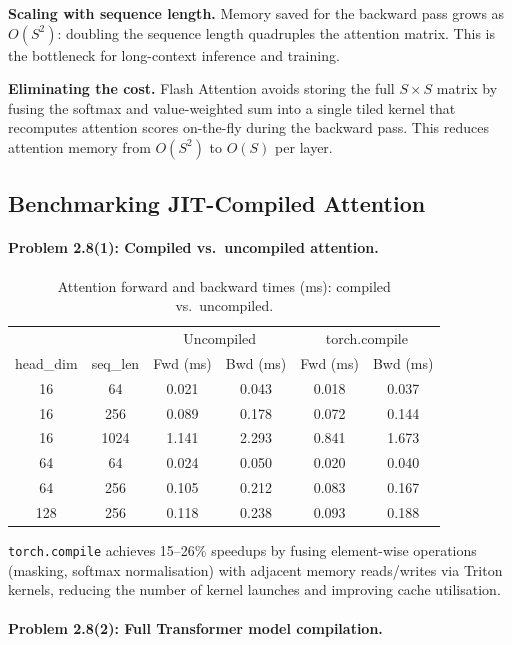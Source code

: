 \documentclass[11pt]{article}
\begin{document}
\textbf{Scaling with sequence length.} Memory saved for the backward pass grows as
$O(S^2)$: doubling the sequence length quadruples the attention matrix. This is the
bottleneck for long-context inference and training.

\textbf{Eliminating the cost.} Flash Attention avoids storing the full $S\times S$
matrix by fusing the softmax and value-weighted sum into a single tiled kernel that
recomputes attention scores on-the-fly during the backward pass. This reduces attention
memory from $O(S^2)$ to $O(S)$ per layer.

\subsection{Benchmarking JIT-Compiled Attention}

\paragraph{Problem 2.8(1): Compiled vs.\ uncompiled attention.}

\begin{table}[H]
\centering
\caption{Attention forward and backward times (ms): compiled vs.\ uncompiled.}
\small
\begin{tabular}{cc|cc|cc}
\toprule
& & \multicolumn{2}{c|}{Uncompiled} & \multicolumn{2}{c}{torch.compile} \\
head\_dim & seq\_len & Fwd (ms) & Bwd (ms) & Fwd (ms) & Bwd (ms) \\
\midrule
16  & 64   & 0.021 & 0.043 & 0.018 & 0.037 \\
16  & 256  & 0.089 & 0.178 & 0.072 & 0.144 \\
16  & 1024 & 1.141 & 2.293 & 0.841 & 1.673 \\
64  & 64   & 0.024 & 0.050 & 0.020 & 0.040 \\
64  & 256  & 0.105 & 0.212 & 0.083 & 0.167 \\
128 & 256  & 0.118 & 0.238 & 0.093 & 0.188 \\
\bottomrule
\end{tabular}
\end{table}

\texttt{torch.compile} achieves 15--26\% speedups by fusing element-wise operations
(masking, softmax normalisation) with adjacent memory reads/writes via Triton kernels,
reducing the number of kernel launches and improving cache utilisation.

\paragraph{Problem 2.8(2): Full Transformer model compilation.}
\end{document}

